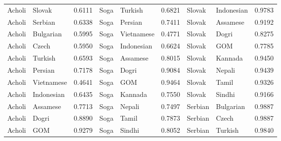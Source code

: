\documentclass[11pt]{article} %
\begin{document}
\begin{table}
\begin{tabular}{llr@{\hspace{12pt}}llr@{\hspace{12pt}}llr}
            Acholi                       & Slovak              & 0.6111        & Soga                & Turkish             & 0.6821        & Slovak              & Indonesian          & 0.9783        \\
            Acholi                       & Serbian             & 0.6338        & Soga                & Persian             & 0.7411        & Slovak              & Assamese            & 0.9192        \\
            Acholi                       & Bulgarian           & 0.5995        & Soga                & Vietnamese          & 0.4771        & Slovak              & Dogri               & 0.8275        \\
            Acholi                       & Czech               & 0.5950        & Soga                & Indonesian          & 0.6624        & Slovak              & GOM                 & 0.7785        \\
            Acholi                       & Turkish             & 0.6593        & Soga                & Assamese            & 0.8015        & Slovak              & Kannada             & 0.9450        \\
            Acholi                       & Persian             & 0.7178        & Soga                & Dogri               & 0.9084        & Slovak              & Nepali              & 0.9439        \\
            Acholi                       & Vietnamese          & 0.4641        & Soga                & GOM                 & 0.9464        & Slovak              & Tamil               & 0.9326        \\
            Acholi                       & Indonesian          & 0.6435        & Soga                & Kannada             & 0.7550        & Slovak              & Sindhi              & 0.9166        \\
            Acholi                       & Assamese            & 0.7713        & Soga                & Nepali              & 0.7497        & Serbian             & Bulgarian           & 0.9887        \\
            Acholi                       & Dogri               & 0.8890        & Soga                & Tamil               & 0.7873        & Serbian             & Czech               & 0.9887        \\
            Acholi                       & GOM                 & 0.9279        & Soga                & Sindhi              & 0.8052        & Serbian             & Turkish             & 0.9840        \\

\end{tabular}
\end{table}
\end{document}
